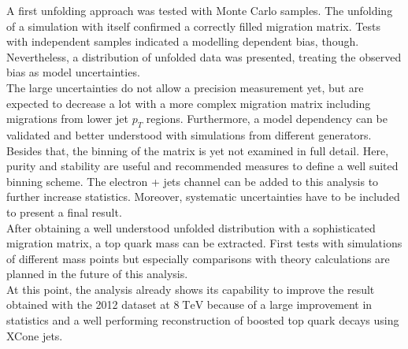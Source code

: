 	A first unfolding approach was tested with Monte Carlo samples. The unfolding of a simulation with itself confirmed a correctly filled migration matrix. Tests with independent samples indicated a modelling dependent bias, though. Nevertheless, a distribution of unfolded data was presented, treating the observed bias as model uncertainties. \\
	The large uncertainties do not allow a precision measurement yet, but are expected to decrease a lot with a more complex migration matrix including migrations from lower jet $p_T$ regions. Furthermore, a model dependency can be validated and better understood with simulations from different generators. Besides that, the binning of the matrix is yet not examined in full detail. Here, purity and stability are useful and recommended measures to define a well suited binning scheme. The electron + jets channel can be added to this analysis to further increase statistics. Moreover, systematic uncertainties have to be included to present a final result. \\
	After obtaining a well understood unfolded distribution with a sophisticated migration matrix, a top quark mass can be extracted. First tests with simulations of different mass points but especially comparisons with theory calculations are planned in the future of this analysis. \\
	At this point, the analysis already shows its capability to improve the result obtained with the 2012 dataset at $8\;\text{TeV}$ because of a large improvement in statistics and a well performing reconstruction of boosted top quark decays using XCone jets.
